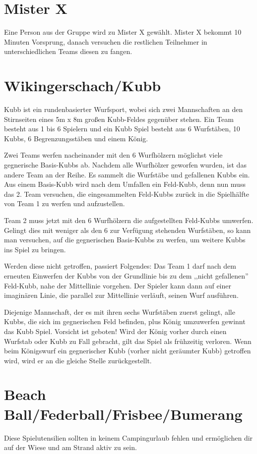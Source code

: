 \documentclass[a4paper]{report}
\begin{document}
\section*{Mister X}
Eine Person aus der Gruppe wird zu Mister X gewählt. Mister X bekommt 10 Minuten Vorsprung, danach versuchen die restlichen Teilnehmer in unterschiedlichen Teams diesen zu fangen.

\section*{Wikingerschach/Kubb}
Kubb ist ein rundenbasierter Wurfsport, wobei sich zwei Mannschaften an den Stirnseiten eines 5m x 8m großen Kubb-Feldes gegenüber stehen. Ein Team besteht aus 1 bis 6 Spielern und ein Kubb Spiel besteht aus 6 Wurfstäben, 10 Kubbs, 6 Begrenzungsstäben und einem König.

Zwei Teams werfen nacheinander mit den 6 Wurfhölzern möglichst viele gegnerische Basis-Kubbs ab. Nachdem alle Wurfhölzer geworfen wurden, ist das andere Team an der Reihe. Es sammelt die Wurfstäbe und gefallenen Kubbs ein. Aus einem Basis-Kubb wird nach dem Umfallen ein Feld-Kubb, denn nun muss das 2. Team versuchen, die eingesammelten Feld-Kubbs zurück in die Spielhälfte von Team 1 zu werfen und aufzustellen.

Team 2 muss jetzt mit den 6 Wurfhölzern die aufgestellten Feld-Kubbs umwerfen. Gelingt dies mit weniger als den 6 zur Verfügung stehenden Wurfstäben, so kann man versuchen, auf die gegnerischen Basis-Kubbs zu werfen, um weitere Kubbs ins Spiel zu bringen.

Werden diese nicht getroffen, passiert Folgendes: Das Team 1 darf nach dem erneuten Einwerfen der Kubbs von der Grundlinie bis zu dem ,,nicht gefallenen'' Feld-Kubb, nahe der Mittellinie vorgehen. Der Spieler kann dann auf einer imaginären Linie, die parallel zur Mittellinie verläuft, seinen Wurf ausführen.

Diejenige Mannschaft, der es mit ihren sechs Wurfstäben zuerst gelingt, alle Kubbs, die sich im gegnerischen Feld befinden, plus König umzuwerfen gewinnt das Kubb Spiel. Vorsicht ist geboten! Wird der König vorher durch einen Wurfstab oder Kubb zu Fall gebracht, gilt das Spiel als frühzeitig verloren. Wenn beim Königswurf ein gegnerischer Kubb (vorher nicht geräumter Kubb) getroffen wird, wird er an die gleiche Stelle zurückgestellt.

\section*{Beach Ball/Federball/Frisbee/Bumerang}
Diese Spielutensilien sollten in keinem Campingurlaub fehlen und ermöglichen dir auf der Wiese und am Strand aktiv zu sein.
\end{document}
